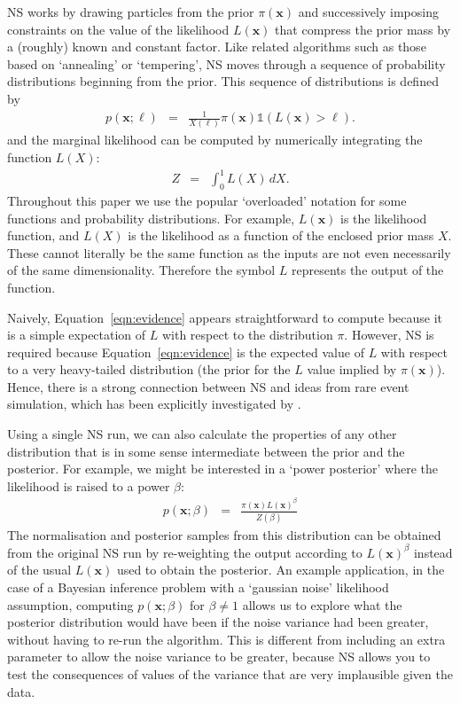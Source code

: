 \documentclass[journal,article,accept,moreauthors,pdftex,12pt,a4paper]{mdpi}
\newcommand{\xx}{\boldsymbol{x}}
\begin{document}
NS works by drawing particles from the
prior $\pi(\xx)$ and successively imposing constraints on the value of
the likelihood $L(\xx)$ that compress the prior mass by a (roughly) known
and constant factor. Like related algorithms such as those
based on `annealing' or `tempering', NS
moves through a sequence of probability distributions beginning from the
prior. This sequence of distributions is defined by
\begin{eqnarray}
p(\xx; \ell) &=& \frac{1}{X(\ell)}\pi(\xx)\mathds{1}\left(L(\xx) > \ell\right).
\label{eq:constrained_prior}
\end{eqnarray}
and the marginal likelihood can be computed by numerically integrating the
function $L(X)$:
\begin{eqnarray}
Z &=& \int_0^1 L(X)\, dX.
\end{eqnarray}
Throughout this paper we use the popular `overloaded' notation for some
functions and probability distributions.
For example, $L(\xx)$ is the likelihood function, and $L(X)$ is the likelihood
as a function of the enclosed prior mass $X$. These cannot literally be the
same function as the inputs are not even necessarily of the same dimensionality.
Therefore the symbol $L$ represents the output of the function.

Naively, Equation~\ref{eqn:evidence} appears straightforward to compute because
it is a simple expectation of $L$ with respect to the distribution $\pi$.
However,
NS is required because Equation~\ref{eqn:evidence}
is the expected value of $L$ with respect to a very heavy-tailed distribution
(the prior for the $L$ value implied by $\pi(\xx)$). Hence, there is a strong
connection between NS and ideas from rare event simulation, which has been
explicitly investigated by \citet{walter}.

Using a single NS run, we can also calculate the properties of any other distribution that
is in some sense intermediate
between the prior and the posterior. For example, we might be interested in
a `power posterior' where the likelihood is raised to a power $\beta$:
\begin{eqnarray}
p(\xx; \beta) &=& \frac{\pi(\xx)L(\xx)^\beta}{Z(\beta)}\label{eqn:power_posterior}
\end{eqnarray}
The normalisation and posterior samples from this distribution can be obtained
from the original NS run by re-weighting the output according to $L(\xx)^\beta$
instead of the usual $L(\xx)$ used to obtain the posterior.
An example application, in the case of
a Bayesian inference problem with a `gaussian noise' likelihood assumption,
computing $p(\xx; \beta)$ for $\beta \neq 1$ allows us to explore what the
posterior distribution would have been if the noise variance had been greater,
without having to re-run the algorithm.
This is different from including an extra parameter to allow the noise variance
to be greater, because NS allows you to test the consequences of values of the
variance that are very implausible given the data.
\end{document}
